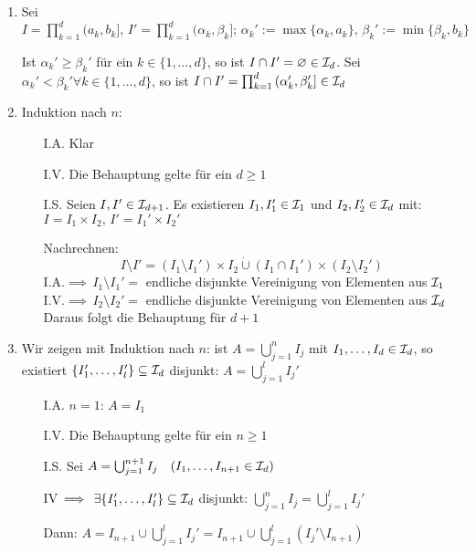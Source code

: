 \documentclass[a4paper,twoside,DIV15,BCOR12mm,chapterprefix=true,headings=onelinechapter]{scrbook}
\begin{document}
\begin{beweis}
\begin{enumerate}
\item Sei \(I=\prod_{k=1}^{d}{(a_{k},b_{k}]},\,I'=\prod_{k=1}^{d}{(\alpha_{k},\beta_{k}]};\,\alpha_{k}':=\max\{\alpha_{k},a_{k}\},\,\beta_{k}':=\min\{\beta_{k},b_{k}\}\)

Ist \(\alpha_{k}'\geq\beta_{k}'\) f\"ur ein \(k\in\{1,\ldots,d\}\), so ist \(I\cap I'=\varnothing\in\mathcal{I}_{d}\).
Sei \(\alpha_{k}'<\beta_{k}'\forall k\in\{1,\ldots,d\}\), so ist \(I\cap I'=\prod_{k=1}^{d}{(\alpha_{k}',\beta_{k}']\in\mathcal{I}_{d}}\)
\item Induktion nach \(n\):
\begin{itemize}
\item[I.A.] Klar \checkmark %
\item[I.V.] Die Behauptung gelte f\"ur ein \(d\geq 1\)
\item[I.S.] Seien \(I,I'\in\mathcal{I}_{d+1}\). Es existieren \(I_{1},I_{1}'\in\mathcal{I}_{1}\) und \(I_{2},I_{2}'\in\mathcal{I}_{d}\) mit:
\(I=I_{1}\times I_{2},\,I'=I_{1}'\times I_{2}'\)

Nachrechnen: 
\[
I\setminus I'=(I_{1}\setminus I_{1}')\times I_{2}\dot \cup(I_{1}\cap I_{1}')\times(I_{2}\setminus I_{2}')
\]
I.A.\(\implies\,I_{1}\setminus I_{1}'=\) endliche disjunkte Vereinigung von Elementen aus \(\mathcal{I}_{1}\)\\
I.V.\(\implies\,I_{2}\setminus I_{2}'=\) endliche disjunkte Vereinigung von Elementen aus \(\mathcal{I}_{d}\)\\
Daraus folgt die Behauptung f\"ur \(d+1\)
\end{itemize}
\item Wir zeigen mit Induktion nach \(n\): ist \(A=\bigcup_{j=1}^{n}{I_{j}}\) mit \(I_{1},\ldots,I_{d}\in\mathcal{I}_{d}\), so
existiert \(\{I_{1}',\ldots,I_{l}'\}\subseteq\mathcal{I}_{d}\) disjunkt: 
\(A=\bigcup_{j=1}^{l}{I_{j}'}\)
\begin{itemize}
\item[I.A.] \(n=1:\,A=I_{1}\)\checkmark
\item[I.V.] Die Behauptung gelte f\"ur ein \(n\geq 1\)
\item[I.S.] Sei \(A=\bigcup_{j=1}^{n+1}{I_{j}}\quad(I_{1},\ldots,I_{n+1}\in\mathcal{I}_{d})\)

IV\(\,\implies\,\exists\{I_{1}',\ldots,I_{l}'\}\subseteq\mathcal{I}_{d}\) disjunkt:
\(\bigcup_{j=1}^{n}{I_{j}}=\bigcup_{j=1}^{l}{I_{j}'}\)	%

Dann: \(A=I_{n+1}\cup\bigcup_{j=1}^{l}{I_{j}'}=I_{n+1}\cup\bigcup_{j=1}^{l}{(I_{j}'\setminus I_{n+1})}\) %


\end{itemize}
\end{enumerate}
\end{beweis}
\end{document}
